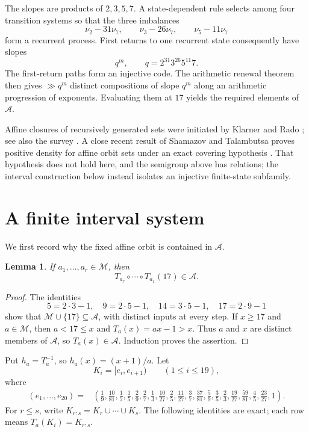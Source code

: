 \documentclass[11pt,a4paper]{amsart}
\newtheorem{lemma}[theorem]{Lemma}
\newcommand{\A}{\mathcal A}
\newcommand{\M}{\mathcal M}
\begin{document}
The slopes are products of $2,3,5,7$. A state-dependent rule selects among four transition systems so that the three imbalances
\[
 \nu_2-31\nu_7,\qquad \nu_3-26\nu_7,\qquad \nu_5-11\nu_7
\]
form a recurrent process. First returns to one recurrent state consequently have slopes
\[
 q^m,\qquad q=2^{31}3^{26}5^{11}7.
\]
The first-return paths form an injective code. The arithmetic renewal theorem then gives $\gg q^m$ distinct compositions of slope $q^m$ along an arithmetic progression of exponents. Evaluating them at $17$ yields the required elements of $\A$.

Affine closures of recursively generated sets were initiated by Klarner and Rado \cite{KlarnerRado}; see also the survey \cite{Lagarias}. A close recent result of Shamazov and Talambutsa proves positive density for affine orbit sets under an exact covering hypothesis \cite{ShamazovTalambutsa}. That hypothesis does not hold here, and the semigroup above has relations; the interval construction below instead isolates an injective finite-state subfamily.

\section{A finite interval system}

We first record why the fixed affine orbit is contained in $\A$.

\begin{lemma}\label{lem:orbit-in-A}
If $a_1,\ldots,a_r\in\M$, then
\[
 T_{a_r}\circ\cdots\circ T_{a_1}(17)\in\A.
\]
\end{lemma}

\begin{proof}
The identities
\[
 5=2\cdot3-1,\quad 9=2\cdot5-1,\quad
 14=3\cdot5-1,\quad 17=2\cdot9-1
\]
show that $\M\cup\{17\}\subseteq\A$, with distinct inputs at every step. If $x\ge17$ and $a\in\M$, then $a<17\le x$ and $T_a(x)=ax-1>x$. Thus $a$ and $x$ are distinct members of $\A$, so $T_a(x)\in\A$. Induction proves the assertion.
\end{proof}

Put $h_a=T_a^{-1}$, so $h_a(x)=(x+1)/a$. Let
\[
 K_i=[e_i,e_{i+1})\qquad(1\le i\le19),
\]
where
\begin{align*}
(e_1,\ldots,e_{20})={}&\left(
\frac19,\frac{10}{81},\frac17,\frac15,\frac29,\frac27,\frac13,
\frac{10}{27},\frac25,\frac{11}{27},\frac37,\frac{37}{81},\frac59,
\frac35,\frac23,\frac{19}{27},\frac{59}{81},\frac45,\frac{23}{27},1
\right).
\end{align*}
For $r\le s$, write $K_{r:s}=K_r\cup\cdots\cup K_s$. The following identities are exact; each row means $T_a(K_i)=K_{r:s}$.
\end{document}
